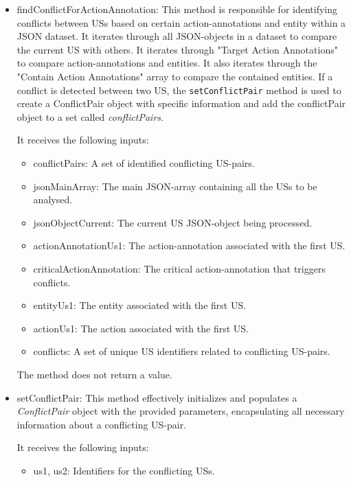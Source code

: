 \begin{itemize}
	\item findConflictForActionAnnotation: This method is responsible for identifying conflicts between USs based on certain action-annotations and entity within a JSON dataset. It iterates through all JSON-objects in a dataset to compare the current US with others. It iterates through "Target Action Annotations" to compare action-annotations and entities. It also iterates through the "Contain Action Annotations" array to compare the contained entities. If a conflict is detected between two US, the \texttt{setConflictPair} method is used to create a ConflictPair object with specific information and add the conflictPair object to a set called \textit{conflictPairs}.
	
	It receives the following inputs:
	\begin{itemize}
		
		\item conflictPairs: A set of identified conflicting US-pairs.
		 
		\item jsonMainArray: The main JSON-array containing all the USs to be analysed.
		
		\item jsonObjectCurrent: The current US JSON-object being processed.
		
		\item actionAnnotationUs1: The action-annotation associated with the first US.
		
		\item criticalActionAnnotation: The critical action-annotation that triggers conflicts.
		
		\item entityUs1: The entity associated with the first US.
		
		\item actionUs1: The action associated with the first US.
		
		\item conflicts: A set of unique US identifiers related to conflicting US-pairs.		
		
	\end{itemize}
	The method does not return a value.
	
	\item setConflictPair: This method effectively initializes and populates a \textit{ConflictPair} object with the provided parameters, encapsulating all necessary information about a conflicting US-pair.
	
	It receives the following inputs:
	\begin{itemize}
		\item us1, us2: Identifiers for the conflicting USs.
		

\end{itemize}
\end{itemize}
